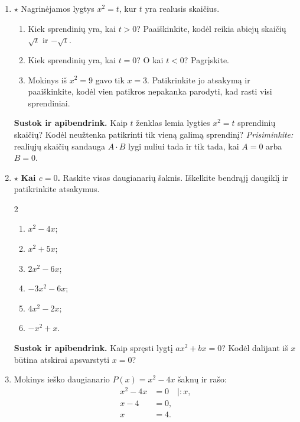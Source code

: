 \documentclass[12pt,a4paper]{article}
\begin{document}
\begin{enumerate}
\begin{multicols}{2}\begin{enumerate}
\item $x^2-9$; \item $x^2+4$; \item $2x^2-8$; \item $-3x^2+12$; \item $4x^2-1$; \item $-x^2-9$.
\end{enumerate}\end{multicols}
\item $\star$ Nagrinėjamos lygtys $x^2=t$, kur $t$ yra realusis skaičius.
\begin{enumerate}
\item Kiek sprendinių yra, kai $t>0$? Paaiškinkite, kodėl reikia abiejų skaičių $\sqrt t$ ir $-\sqrt t$.
\item Kiek sprendinių yra, kai $t=0$? O kai $t<0$? Pagrįskite.
\item Mokinys iš $x^2=9$ gavo tik $x=3$. Patikrinkite jo atsakymą ir paaiškinkite, kodėl vien patikros nepakanka parodyti, kad rasti visi sprendiniai.
\end{enumerate}
\par\medskip
\textbf{Sustok ir apibendrink.} Kaip $t$ ženklas lemia lygties $x^2=t$ sprendinių skaičių? Kodėl neužtenka patikrinti tik vieną galimą sprendinį?
\textit{Prisiminkite:} realiųjų skaičių sandauga $A\cdot B$ lygi nuliui tada ir tik tada, kai $A=0$ arba $B=0$.
\item $\star$ \textbf{Kai $c=0$.} Raskite visas daugianarių šaknis. Iškelkite bendrąjį daugiklį ir patikrinkite atsakymus.
\begin{multicols}{2}\begin{enumerate}
\item $x^2-4x$; \item $x^2+5x$; \item $2x^2-6x$; \item $-3x^2-6x$; \item $4x^2-2x$; \item $-x^2+x$.
\end{enumerate}\end{multicols}
\par\medskip
\textbf{Sustok ir apibendrink.} Kaip spręsti lygtį $ax^2+bx=0$? Kodėl dalijant iš $x$ būtina atskirai apsvarstyti $x=0$?
\item Mokinys ieško daugianario $P(x)=x^2-4x$ šaknų ir rašo:
\[
\begin{aligned}x^2-4x&=0\quad\mid :x,\\x-4&=0,\\x&=4.\end{aligned}
\]
\end{enumerate}
\end{document}
